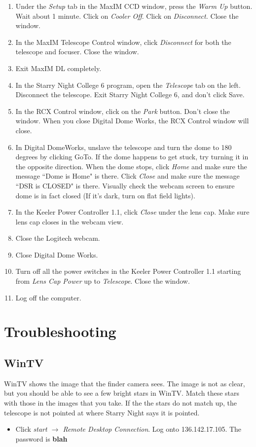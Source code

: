 \documentclass[11pt]{report}
\begin{document}
\begin{enumerate}
\item Under the \emph{Setup} tab in the MaxIM CCD window, press the \emph{Warm Up} button. Wait about 1 minute. Click on \emph{Cooler Off}. Click on \emph{Disconnect.} Close the window.
\item In the MaxIM Telescope Control window, click \emph{Disconnect} for both the telescope and focuser. Close the window.
\item Exit MaxIM DL completely.
\item In the Starry Night College 6 program, open the \emph{Telescope} tab on the left. Disconnect the telescope. Exit Starry Night College 6, and don't click Save.
\item In the RCX Control window, click on the \emph{Park} button. Don't close the window. When you close Digital Dome Works, the RCX Control window will close.
\item In Digital DomeWorks, unslave the telescope and turn the dome to 180 degrees by clicking GoTo. If the dome happens to get stuck, try turning it in the opposite direction. When the dome stops, click \emph{Home} and make sure the message ``Dome is Home" is there. Click \emph{Close} and make sure the message ``DSR is CLOSED" is there. Visually check the webcam screen to ensure dome is in fact closed (If it's dark, turn on flat field lights).
\item In the Keeler Power Controller 1.1, click \emph{Close} under the lens cap. Make sure lens cap closes in the webcam view.
\item Close the Logitech webcam.
\item Close Digital Dome Works.
\item Turn off all the power switches in the Keeler Power Controller 1.1 starting from \emph{Lens Cap Power} up to \emph{Telescope}. Close the window. 
\item Log off the computer.
\end{enumerate}

\chapter{Troubleshooting}

\section{WinTV}

WinTV shows the image that the finder camera sees. The image is not as clear, but you should be able to see a few bright stars in WinTV. Match these stars with those in the images that you take. If the the stars do not match up, the telescope is not pointed at where Starry Night says it is pointed.
\begin{itemize}
\item Click \emph{start {$\rightarrow$} Remote Desktop Connection}. Log onto 136.142.17.105. The password is {\bf blah}
\end{itemize}
\end{document}
